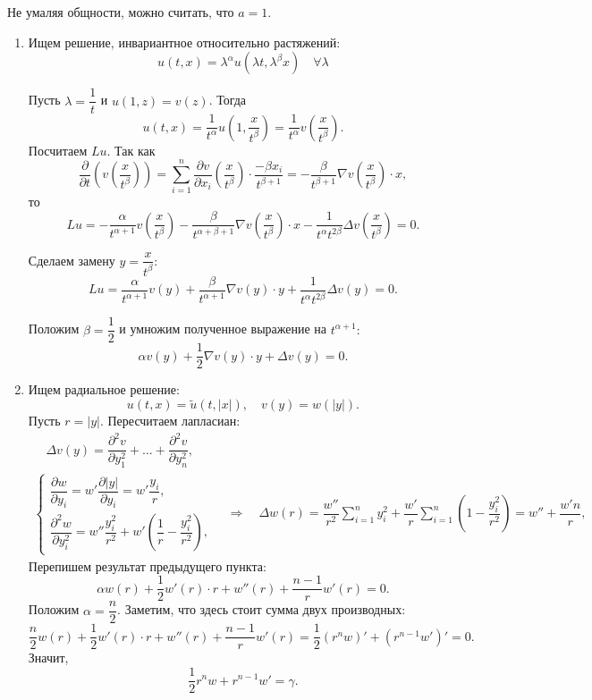 Не умаляя общности, можно считать, что $a = 1$.

\begin{enumerate}
\item Ищем решение, инвариантное относительно растяжений:
$$u(t,x) = \lambda^\alpha u(\lambda t, \lambda^\beta x) \quad \forall \lambda$$

Пусть $\lambda = \dfrac{1} {t}$ и $u(1, z) = v(z)$. Тогда
$$u(t,x) = \frac{1}{t^\alpha} u \left( 1, \frac{x}{t^\beta} \right) = \frac {1} {t^\alpha} v \left( \frac{x}{t^\beta} \right).$$
Посчитаем $Lu$. Так как
$$\frac{\partial}{\partial t} \left(v\left( \frac{x}{t^\beta}\right)\right) = \sum \limits_{i=1}^n \frac{ \partial v}{\partial x_i}\left(\frac{x}{t^\beta}\right) \cdot \frac{-\beta x_i}{t^{\beta + 1}} = -\frac{\beta}{t^{\beta + 1}}\nabla v\left( \frac{x}{t^\beta}\right) \cdot x,$$
то
$$Lu = -\frac{\alpha}{t^{\alpha + 1}} v\left( \dfrac{x}{t^\beta}\right) - \dfrac{\beta}{t^{\alpha + \beta + 1}}\nabla v\left( \dfrac{x}{t^\beta}\right)\cdot x - \dfrac{1}{t^\alpha t^{2\beta}}\Delta v\left( \dfrac{x}{t^\beta}\right) = 0.$$

Сделаем замену $ y = \dfrac{x} {t^\beta}$:
$$Lu =  \dfrac{\alpha}{t^{\alpha + 1}} v(y) + \dfrac{\beta}{t^{\alpha + 1}} \nabla v(y) \cdot y + \dfrac{1}{t^\alpha  t^{2\beta}}\Delta v(y)=0.$$

Положим $\beta = \dfrac{1}{2}$ и умножим полученное выражение на $t^{\alpha + 1}:$
$$\alpha v(y) + \dfrac{1}{2} \nabla v(y) \cdot y + \Delta v(y) = 0.$$

\item Ищем радиальное решение:
$$u(t,x) = \tilde{u}(t,|x|), \quad v(y) = w(|y|).$$
Пусть $r = |y|$. Пересчитаем лапласиан:
\begin{gather*}
	\quad \Delta v(y) = \dfrac{\partial^2v}{\partial y_1^2} + \dots + \dfrac{\partial^2v}{\partial y_n^2}, \\
	\begin{cases*}
		\dfrac{\partial w}{\partial y_i} = w' \dfrac{\partial |y|}{\partial y_i} = w' \dfrac{y_i}{r}, \\
		\dfrac{\partial^2 w}{\partial y_i^2} = w''\dfrac{y_i^2}{r^2} + w'\left(\dfrac{1}{r} - \dfrac{y_i^2}{r^2}\right),
	\end{cases*}
	\quad \Rightarrow \quad
	\Delta w(r) = \dfrac{w''}{r^2}\sum \limits_{i=1}^n y_i^2 + \dfrac{w'}{r}\sum \limits_{i=1}^n (1 - \dfrac{y_i^2}{r^2}) = w'' + \dfrac{w'n}{r},
\end{gather*}
Перепишем результат предыдущего пункта:
$$ \alpha w(r) + \dfrac{1}{2} w'(r) \cdot r + w''(r) + \dfrac{n-1}{r}w'(r) = 0.$$
Положим $\alpha = \dfrac{n}{2}$. Заметим, что здесь стоит сумма двух производных:
$$ \dfrac{n}{2}w(r) + \dfrac{1}{2}w'(r) \cdot r + w''(r) + \dfrac{n-1}{r}w'(r) = \dfrac{1}{2}\left(r^nw\right)' + \left(r^{n-1}w'\right)' = 0.$$
Значит,
$$ \dfrac{1}{2} r^n w+ r^{n-1} w' = \gamma. $$


\end{enumerate}
